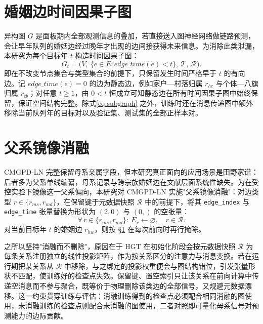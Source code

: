 \section{婚姻边时间因果子图}\label{sec:temporal-subgraph}

异构图 \(G\) 是面板期内全部观测信息的叠加，若直接送入图神经网络做链路预测，会让早年队列的婚姻边经过晚年才出现的边间接获得未来信息。为消除此类泄漏，本研究为每个目标年 \(t\) 构造时间因果子图：
\begin{equation}
G_t = \bigl(V,\ \{e\in E : \mathit{edge\_time}(e) < t\},\ \mathcal{T},\ \mathcal{R}\bigr).
\label{eq:subgraph}
\end{equation}
即在不改变节点集合与类型集合的前提下，只保留发生时间严格早于 \(t\) 的有向边。记 \(\mathit{edge\_time}(e)=0\) 的边为静态边，例如家户—村落归属 \(r_{hc}\) 与个体—八旗归属 \(r_{cb}\)；对任意 \(t\ge 1\)，由 \(0<t\) 恒成立可知静态边在所有时间因果子图中始终保留，保证空间结构完整。除式\eqref{eq:subgraph} 之外，训练时还在消息传递图中额外移除当前队列年的目标对以及验证集、测试集的全部正样本对。

\section{父系镜像消融}\label{sec:ablation}

CMGPD-LN 完整保留母系亲属字段，但本研究真正面向的应用场景是田野家谱：后者多为父系单线编纂，母系记录与跨宗族婚姻边在文献层面系统性缺失\citep{zhao2001chinese}。为在受控实验下镜像这一父系偏向，本研究对 CMGPD-LN 实施"父系镜像消融"：对边类型 \(r\in\{r_{ms},r_{md}\}\)，在保留键于元数据快照 \(\mathcal{R}\) 中的前提下，将其 \texttt{edge\_index} 与 \texttt{edge\_time} 张量替换为形状为 \((2,0)\) 与 \((0,)\) 的空张量：
\[
\forall\,r\in\{r_{ms},r_{md}\}:\ E_r\leftarrow\varnothing,\quad r\in\mathcal{R}.
\]
对当前目标年 \(t\) 的婚姻边 \(r_{hw}\)，则按 \S\ref{sec:temporal-subgraph} 在每次前向时再行掩除。

之所以坚持"消融而不删除"，原因在于 HGT 在初始化阶段会按元数据快照 \(\mathcal{R}\) 为每条关系注册独立的线性投影矩阵，作为按关系区分的注意力与消息变换\citep{hu2020hgt}。若在运行期把某关系从 \(\mathcal{R}\) 中移除，与之绑定的投影权重便会与图结构错位，引发张量形状不匹配，使训练好的检查点失效。保留键、置空索引只让该关系在前向计算中传递空消息而不参与聚合，既等价于物理删除该类边的全部信号，又规避元数据漂移。这一约束贯穿训练与评估：消融训练得到的检查点必须配合相同消融的图使用，未消融训练的检查点则配合未消融的图使用，二者对照即可量化母系信号对预测能力的边际贡献。
